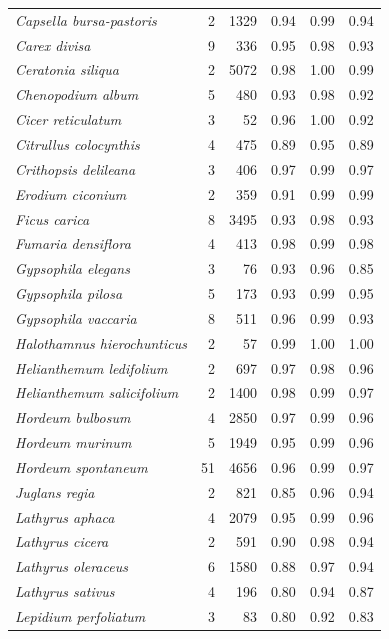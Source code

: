 \documentclass[
  authoryear,
  preprint]{elsarticle}
\begin{document}
\begin{longtable}{@{\extracolsep{\fill}}lrrrrr}
{\itshape Capsella bursa-pastoris} & 2 & 1329 & 0.94 & 0.99 & 0.94 \\ 
{\itshape Carex divisa} & 9 & 336 & 0.95 & 0.98 & 0.93 \\ 
{\itshape Ceratonia siliqua} & 2 & 5072 & 0.98 & 1.00 & 0.99 \\ 
{\itshape Chenopodium album} & 5 & 480 & 0.93 & 0.98 & 0.92 \\ 
{\itshape Cicer reticulatum} & 3 & 52 & 0.96 & 1.00 & 0.92 \\ 
{\itshape Citrullus colocynthis} & 4 & 475 & 0.89 & 0.95 & 0.89 \\ 
{\itshape Crithopsis delileana} & 3 & 406 & 0.97 & 0.99 & 0.97 \\ 
{\itshape Erodium ciconium} & 2 & 359 & 0.91 & 0.99 & 0.99 \\ 
{\itshape Ficus carica} & 8 & 3495 & 0.93 & 0.98 & 0.93 \\ 
{\itshape Fumaria densiflora} & 4 & 413 & 0.98 & 0.99 & 0.98 \\ 
{\itshape Gypsophila elegans} & 3 & 76 & 0.93 & 0.96 & 0.85 \\ 
{\itshape Gypsophila pilosa} & 5 & 173 & 0.93 & 0.99 & 0.95 \\ 
{\itshape Gypsophila vaccaria} & 8 & 511 & 0.96 & 0.99 & 0.93 \\ 
{\itshape Halothamnus hierochunticus} & 2 & 57 & 0.99 & 1.00 & 1.00 \\ 
{\itshape Helianthemum ledifolium} & 2 & 697 & 0.97 & 0.98 & 0.96 \\ 
{\itshape Helianthemum salicifolium} & 2 & 1400 & 0.98 & 0.99 & 0.97 \\ 
{\itshape Hordeum bulbosum} & 4 & 2850 & 0.97 & 0.99 & 0.96 \\ 
{\itshape Hordeum murinum} & 5 & 1949 & 0.95 & 0.99 & 0.96 \\ 
{\itshape Hordeum spontaneum} & 51 & 4656 & 0.96 & 0.99 & 0.97 \\ 
{\itshape Juglans regia} & 2 & 821 & 0.85 & 0.96 & 0.94 \\ 
{\itshape Lathyrus aphaca} & 4 & 2079 & 0.95 & 0.99 & 0.96 \\ 
{\itshape Lathyrus cicera} & 2 & 591 & 0.90 & 0.98 & 0.94 \\ 
{\itshape Lathyrus oleraceus} & 6 & 1580 & 0.88 & 0.97 & 0.94 \\ 
{\itshape Lathyrus sativus} & 4 & 196 & 0.80 & 0.94 & 0.87 \\ 
{\itshape Lepidium perfoliatum} & 3 & 83 & 0.80 & 0.92 & 0.83 \\ 

\end{longtable}
\end{document}
